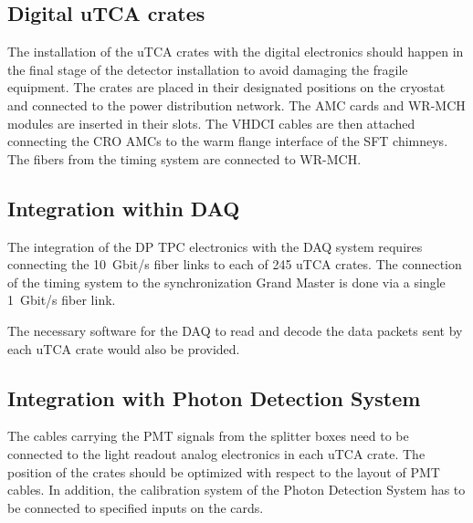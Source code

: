 \subsection{Digital uTCA crates}
\label{sec:fddp-tpc-elec-install-utca}
The installation of the uTCA crates with the digital electronics should happen in the final stage of the detector installation to avoid damaging the fragile equipment. The crates are placed in their designated positions on the cryostat and connected to the power distribution network. The AMC cards and WR-MCH modules are inserted in their slots. The VHDCI cables are then attached connecting the CRO AMCs to the warm flange interface of the SFT chimneys.  The fibers from the timing system are connected to WR-MCH. 



\subsection{Integration within DAQ}
\label{sec:fddp-tpc-elec-install-daq}
The integration of the DP TPC electronics with the DAQ system requires connecting the \SI{10}{Gbit/s} fiber links to each of \num{245} uTCA crates. The connection of the timing system to the synchronization Grand Master is done via a single \SI{1}{Gbit/s} fiber link. 

The necessary software for the DAQ to read and decode the data packets sent by each uTCA crate would also be provided.   

\subsection{Integration with Photon Detection System}
\label{sec:fddp-tpc-elec-install-pmt}
The cables carrying the PMT signals from the splitter boxes need to be connected to the light readout analog electronics in each uTCA crate. The position of the crates should be optimized with respect to the layout of PMT cables. In addition, the calibration system of the Photon Detection System has to be connected to specified inputs on the cards.

